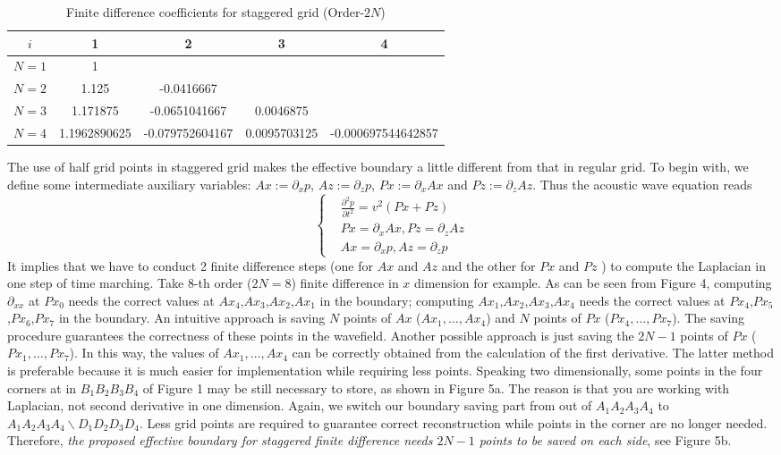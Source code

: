 \begin{table*}
  \centering
  \caption{Finite difference coefficients for staggered grid (Order-$2N$)}\label{table:2}
  \begin{tabular}{c|c|c|c|c}
     \hline
     $i$ 	& 1 		& 2 		& 3 		& 4\\
     \hline
     $N=1$	&1 		&  		&  		&   	\\
     $N=2$ 	&1.125		&-0.0416667	&		&   	\\
     $N=3$	&1.171875	&-0.0651041667	&0.0046875	&	\\
     $N=4$	&1.1962890625	&-0.079752604167&0.0095703125	&-0.000697544642857\\
     \hline
   \end{tabular}
\end{table*}

The use of half grid points in staggered grid makes the effective boundary a little different from that in regular grid. To begin with, we define some intermediate auxiliary variables: $Ax:=\partial_x p$, $Az:=\partial_z p$, $Px:=\partial_x Ax$ and $Pz:=\partial_z Az$. Thus the acoustic wave equation reads
\begin{equation}\label{}
\left\{
\begin{split}
&\frac{\partial^2 p}{\partial t^2}=v^2\left(Px+Pz\right)\\
&Px=\partial_x Ax,Pz=\partial_z Az\\
&Ax=\partial_x p, Az=\partial_z p
\end{split}
\right.
\end{equation}
It implies that we have to conduct 2 finite difference steps (one for $Ax$ and $Az$ and the other for $Px$ and $Pz$ ) to compute the Laplacian in one step of time marching. Take 8-th order ($2N=8$) finite difference in $x$ dimension for example. As can be seen from Figure 4, computing $\partial_{xx}$ at $Px_0$ needs the correct values at $Ax_4$,$Ax_3$,$Ax_2$,$Ax_1$ in the boundary; computing $Ax_1$,$Ax_2$,$Ax_3$,$Ax_4$ needs the correct values at $Px_4$,$Px_5$,$Px_6$,$Px_7$ in the boundary. An intuitive approach is saving $N$ points of $Ax$ ($Ax_1,\ldots,Ax_4$) and $N$ points of $Px$ ($Px_4, \ldots, Px_7$). The saving procedure guarantees the correctness of these points in the wavefield. Another possible approach is just saving the $2N-1$ points of $Px$ ($Px_1,\ldots, Px_7$). In this way, the values of $Ax_1,\ldots,Ax_4$ can be correctly obtained from the calculation of the first derivative.
The latter method is preferable because it is much easier for implementation while requiring less points. Speaking two dimensionally, some points in the four corners at in $B_1B_2B_3B_4$ of Figure 1 may be still necessary to store, as shown in Figure 5a. The reason is that you are working with Laplacian, not second derivative in one dimension. Again, we switch our boundary saving part from out of $A_1A_2A_3A_4$ to $A_1A_2A_3A_4\backslash D_1D_2D_3D_4$. Less grid points are required to guarantee correct reconstruction  while points in the corner are no longer needed. Therefore, \emph{the proposed effective boundary for staggered finite difference needs $2N-1$ points to be saved on each side}, see Figure 5b.



